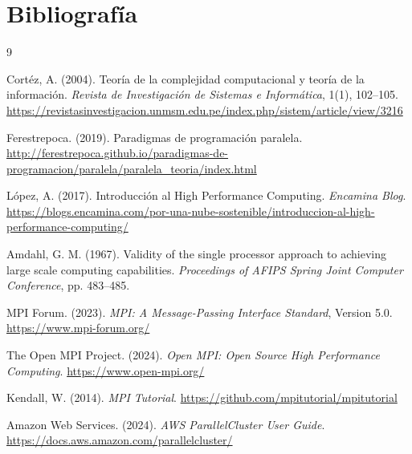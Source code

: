 \documentclass{article}
\begin{document}
\newpage
\section{Bibliografía}

\begin{thebibliography}{9}

    Cortéz, A. (2004). Teoría de la complejidad computacional y teoría de la información.
    \textit{Revista de Investigación de Sistemas e Informática}, 1(1), 102--105.
    \url{https://revistasinvestigacion.unmsm.edu.pe/index.php/sistem/article/view/3216}

    Ferestrepoca. (2019). Paradigmas de programación paralela.
    \url{http://ferestrepoca.github.io/paradigmas-de-programacion/paralela/paralela_teoria/index.html}

    López, A. (2017). Introducción al High Performance Computing. \textit{Encamina Blog}.
    \url{https://blogs.encamina.com/por-una-nube-sostenible/introduccion-al-high-performance-computing/}

    Amdahl, G. M. (1967). Validity of the single processor approach to achieving large scale computing capabilities.
    \textit{Proceedings of AFIPS Spring Joint Computer Conference}, pp. 483--485.

    MPI Forum. (2023). \textit{MPI: A Message-Passing Interface Standard}, Version 5.0.
    \url{https://www.mpi-forum.org/}

    The Open MPI Project. (2024). \textit{Open MPI: Open Source High Performance Computing}.
    \url{https://www.open-mpi.org/}

    Kendall, W. (2014). \textit{MPI Tutorial}.
    \url{https://github.com/mpitutorial/mpitutorial}

    Amazon Web Services. (2024). \textit{AWS ParallelCluster User Guide}.
    \url{https://docs.aws.amazon.com/parallelcluster/}

\end{thebibliography}
\end{document}
